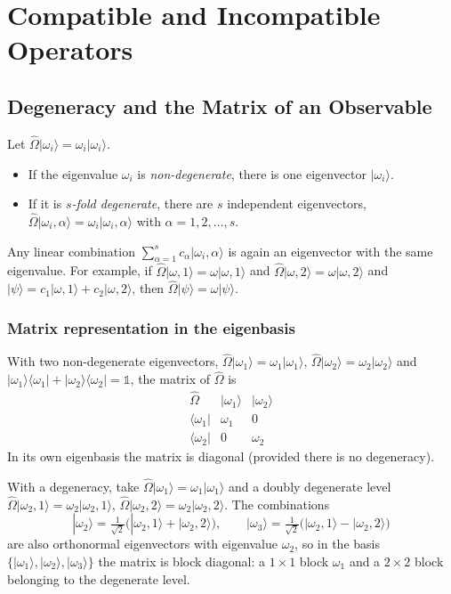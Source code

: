 \documentclass[11pt,a4paper]{article}
\begin{document}
\section{Compatible and Incompatible Operators}
\label{fd:sec:compat}

\subsection{Degeneracy and the Matrix of an Observable}
Let $\hat\Omega|\omega_i\rangle=\omega_i|\omega_i\rangle$.
\begin{itemize}[itemsep=1pt]
\item If the eigenvalue $\omega_i$ is \emph{non-degenerate}, there is one eigenvector $|\omega_i\rangle$.
\item If it is \emph{$s$-fold degenerate}, there are $s$ independent eigenvectors, $\hat\Omega|\omega_i,\alpha\rangle=\omega_i|\omega_i,\alpha\rangle$ with $\alpha=1,2,\dots,s$.
\end{itemize}
Any linear combination $\sum_{\alpha=1}^sc_\alpha|\omega_i,\alpha\rangle$ is again an eigenvector with the same eigenvalue. For example, if $\hat\Omega|\omega,1\rangle=\omega|\omega,1\rangle$ and $\hat\Omega|\omega,2\rangle=\omega|\omega,2\rangle$ and $|\psi\rangle=c_1|\omega,1\rangle+c_2|\omega,2\rangle$, then $\hat\Omega|\psi\rangle=\omega|\psi\rangle$.

\subsubsection*{Matrix representation in the eigenbasis}
With two non-degenerate eigenvectors, $\hat\Omega|\omega_1\rangle=\omega_1|\omega_1\rangle$, $\hat\Omega|\omega_2\rangle=\omega_2|\omega_2\rangle$ and $|\omega_1\rangle\langle\omega_1|+|\omega_2\rangle\langle\omega_2|=\mathbb 1$, the matrix of $\hat\Omega$ is
\[
\begin{array}{c|cc}
\hat\Omega&|\omega_1\rangle&|\omega_2\rangle\\\hline
\langle\omega_1|&\omega_1&0\\
\langle\omega_2|&0&\omega_2
\end{array}
\]
In its own eigenbasis the matrix is diagonal (provided there is no degeneracy).

With a degeneracy, take $\hat\Omega|\omega_1\rangle=\omega_1|\omega_1\rangle$ and a doubly degenerate level $\hat\Omega|\omega_2,1\rangle=\omega_2|\omega_2,1\rangle$, $\hat\Omega|\omega_2,2\rangle=\omega_2|\omega_2,2\rangle$. The combinations
\[
|\omega_2\rangle=\tfrac1{\sqrt2}\big(|\omega_2,1\rangle+|\omega_2,2\rangle\big),\qquad
|\omega_3\rangle=\tfrac1{\sqrt2}\big(|\omega_2,1\rangle-|\omega_2,2\rangle\big)
\]
are also orthonormal eigenvectors with eigenvalue $\omega_2$, so in the basis $\{|\omega_1\rangle,|\omega_2\rangle,|\omega_3\rangle\}$ the matrix is block diagonal: a $1\times1$ block $\omega_1$ and a $2\times2$ block belonging to the degenerate level.
\end{document}
